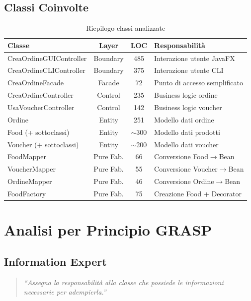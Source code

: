 \documentclass[12pt,a4paper]{article}
\begin{document}
\subsection{Classi Coinvolte}

\begin{table}[h]
\centering
\begin{tabular}{|l|c|c|l|}
\hline
\textbf{Classe} & \textbf{Layer} & \textbf{LOC} & \textbf{Responsabilità} \\
\hline
CreaOrdineGUIController & Boundary & 485 & Interazione utente JavaFX \\
CreaOrdineCLIController & Boundary & 375 & Interazione utente CLI \\
CreaOrdineFacade & Facade & 72 & Punto di accesso semplificato \\
CreaOrdineController & Control & 235 & Business logic ordine \\
UsaVoucherController & Control & 142 & Business logic voucher \\
Ordine & Entity & 251 & Modello dati ordine \\
Food (+ sottoclassi) & Entity & $\sim$300 & Modello dati prodotti \\
Voucher (+ sottoclassi) & Entity & $\sim$200 & Modello dati voucher \\
FoodMapper & Pure Fab. & 66 & Conversione Food$\to$Bean \\
VoucherMapper & Pure Fab. & 55 & Conversione Voucher$\to$Bean \\
OrdineMapper & Pure Fab. & 46 & Conversione Ordine$\to$Bean \\
FoodFactory & Pure Fab. & 75 & Creazione Food + Decorator \\
\hline
\end{tabular}
\caption{Riepilogo classi analizzate}
\end{table}

\section{Analisi per Principio GRASP}

\subsection{Information Expert}

\begin{quote}
\textit{``Assegna la responsabilità alla classe che possiede le informazioni necessarie per adempierla.''}
\end{quote}
\end{document}
